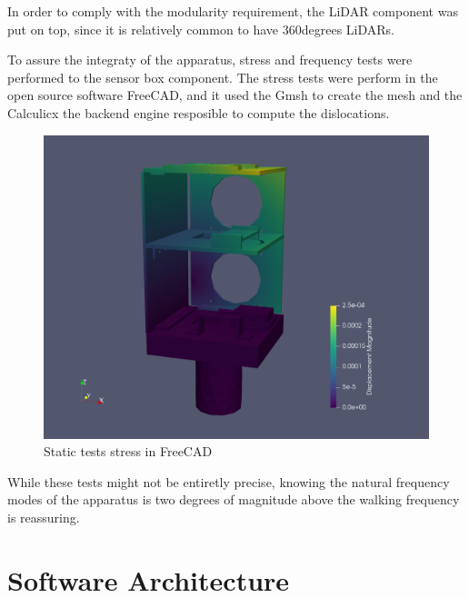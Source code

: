 In order to comply with the modularity requirement, the LiDAR component was put on top, since it is relatively common to have 360degrees LiDARs.







To assure the integraty of the apparatus, stress and frequency tests were performed to the sensor box component. The stress tests were perform in the open source software FreeCAD, and it used the Gmsh to create the mesh and the Calculicx the backend engine resposible to compute the dislocations.

\begin{figure}[H]
    \centering
    \includegraphics[width=0.9\linewidth]{images/stress_test1.png}
    \caption{Static tests stress in FreeCAD}
    \label{fig: static stress test}
\end{figure}


While these tests might not be entiretly precise, knowing the natural frequency modes of the apparatus is two degrees of magnitude above the walking frequency is reassuring.




\section{Software Architecture}


